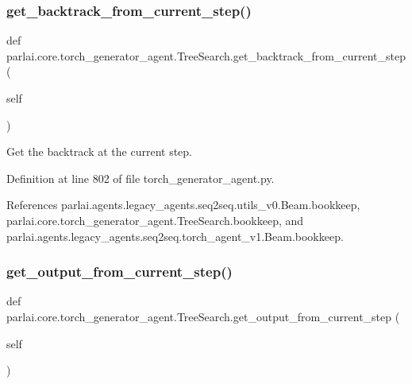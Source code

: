 \subsubsection{\texorpdfstring{get\+\_\+backtrack\+\_\+from\+\_\+current\+\_\+step()}{get\_backtrack\_from\_current\_step()}}
{\footnotesize\ttfamily def parlai.\+core.\+torch\+\_\+generator\+\_\+agent.\+Tree\+Search.\+get\+\_\+backtrack\+\_\+from\+\_\+current\+\_\+step (\begin{DoxyParamCaption}\item[{}]{self }\end{DoxyParamCaption})}

\begin{DoxyVerb}Get the backtrack at the current step.\end{DoxyVerb}
 

Definition at line 802 of file torch\+\_\+generator\+\_\+agent.\+py.



References parlai.\+agents.\+legacy\+\_\+agents.\+seq2seq.\+utils\+\_\+v0.\+Beam.\+bookkeep, parlai.\+core.\+torch\+\_\+generator\+\_\+agent.\+Tree\+Search.\+bookkeep, and parlai.\+agents.\+legacy\+\_\+agents.\+seq2seq.\+torch\+\_\+agent\+\_\+v1.\+Beam.\+bookkeep.

\mbox{\label{classparlai_1_1core_1_1torch__generator__agent_1_1TreeSearch_a929ecbf60f149968caae5a0a6908d67a}} 
\subsubsection{\texorpdfstring{get\+\_\+output\+\_\+from\+\_\+current\+\_\+step()}{get\_output\_from\_current\_step()}}
{\footnotesize\ttfamily def parlai.\+core.\+torch\+\_\+generator\+\_\+agent.\+Tree\+Search.\+get\+\_\+output\+\_\+from\+\_\+current\+\_\+step (\begin{DoxyParamCaption}\item[{}]{self }\end{DoxyParamCaption})}

